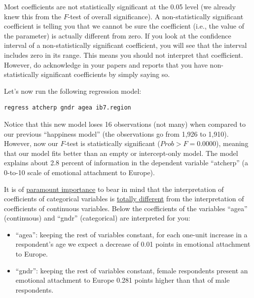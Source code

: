 Most coefficients are not statistically significant at the 0.05 level (we already knew this from the $F$-test of overall significance). A non-statistically significant coefficient is telling you that we cannot be sure the coefficient (i.e., the value of the parameter) is actually different from zero. If you look at the confidence interval of a non-statistically significant coefficient, you will see that the interval includes zero in its range. This means you should not interpret that coefficient. However, do acknowledge in your papers and reports that you have non-statistically significant coefficients by simply saying so.

Let's now run the following regression model:

\begin{lstlisting}
regress atcherp gndr agea ib7.region
\end{lstlisting}

Notice that this new model loses 16 observations (not many) when compared to our previous ``happiness model'' (the observations go from 1,926 to 1,910). However, now our $F$-test is statistically significant  ($Prob > F = 0.0000$), meaning that our model fits better than an empty or intercept-only model. The model explains about 2.8 percent of information in the dependent variable ``atcherp'' (a 0-to-10 scale of emotional attachment to Europe).

It is of \underline{paramount importance} to bear in mind that the interpretation of coefficients of categorical variables is \underline{totally different} from the interpretation of coefficients of continuous variables. Below the coefficients of the variables ``agea'' (continuous) and ``gndr'' (categorical) are interpreted for you:

\begin{itemize}
	\item ``agea'': keeping the rest of variables constant, for each one-unit increase in a respondent's age we expect a decrease of 0.01 points in emotional attachment to Europe.
	\item ``gndr'': keeping the rest of variables constant, female respondents present an emotional attachment to Europe 0.281 points higher than that of male respondents. 
\end{itemize}

